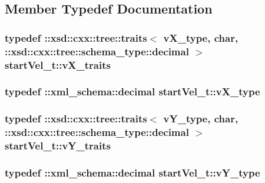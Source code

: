\subsection{Member Typedef Documentation}
\hypertarget{classstartVel__t_aed77c2d2723441913480ac21aa2424a2}{
\subsubsection[{v\-X\-\_\-traits}]{\setlength{\rightskip}{0pt plus 5cm}typedef \-::xsd\-::cxx\-::tree\-::traits$<$ {\bf v\-X\-\_\-type}, char, \-::xsd\-::cxx\-::tree\-::schema\-\_\-type\-::decimal $>$ {\bf start\-Vel\-\_\-t\-::v\-X\-\_\-traits}}}\label{classstartVel__t_aed77c2d2723441913480ac21aa2424a2}
\hypertarget{classstartVel__t_a4f5683f832e22f177e3dd87c931333fb}{
\subsubsection[{v\-X\-\_\-type}]{\setlength{\rightskip}{0pt plus 5cm}typedef \-::{\bf xml\-\_\-schema\-::decimal} {\bf start\-Vel\-\_\-t\-::v\-X\-\_\-type}}}\label{classstartVel__t_a4f5683f832e22f177e3dd87c931333fb}
\hypertarget{classstartVel__t_a3048aec0781a452ce20e59c13368a62a}{
\subsubsection[{v\-Y\-\_\-traits}]{\setlength{\rightskip}{0pt plus 5cm}typedef \-::xsd\-::cxx\-::tree\-::traits$<$ {\bf v\-Y\-\_\-type}, char, \-::xsd\-::cxx\-::tree\-::schema\-\_\-type\-::decimal $>$ {\bf start\-Vel\-\_\-t\-::v\-Y\-\_\-traits}}}\label{classstartVel__t_a3048aec0781a452ce20e59c13368a62a}
\hypertarget{classstartVel__t_ae5903806f237d8ceddf10c273a3d2002}{
\subsubsection[{v\-Y\-\_\-type}]{\setlength{\rightskip}{0pt plus 5cm}typedef \-::{\bf xml\-\_\-schema\-::decimal} {\bf start\-Vel\-\_\-t\-::v\-Y\-\_\-type}}}\label{classstartVel__t_ae5903806f237d8ceddf10c273a3d2002}
